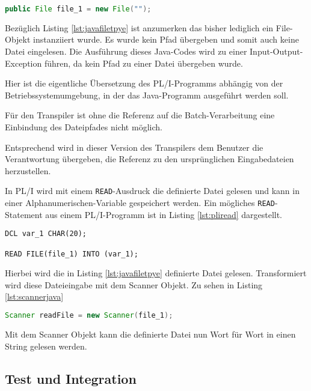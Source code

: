 \begin{lstlisting}[language=Java, caption=File Objekt in Java, label={lst:javafiletpye}]
public File file_1 = new File("");
\end{lstlisting} 

Bezüglich Listing \ref{lst:javafiletpye} ist anzumerken das bisher lediglich ein File-Objekt instanziiert wurde.
Es wurde kein Pfad übergeben und somit auch keine Datei eingelesen. 
Die Ausführung dieses Java-Codes wird zu einer Input-Output-Exception führen, da kein Pfad zu einer Datei übergeben wurde.

Hier ist die eigentliche Übersetzung des PL/I-Programms abhängig von der Betriebssystemumgebung, in der das Java-Programm ausgeführt werden soll.

Für den Transpiler ist ohne die Referenz auf die Batch-Verarbeitung eine Einbindung des Dateipfades nicht möglich.

Entsprechend wird in dieser Version des Transpilers dem Benutzer die Verantwortung übergeben, die Referenz zu den ursprünglichen Eingabedateien herzustellen.

In PL/I wird mit einem \verb+READ+-Ausdruck die definierte Datei gelesen und kann in einer Alphanumerischen-Variable gespeichert werden.
Ein mögliches \verb+READ+-Statement aus einem PL/I-Programm ist in Listing \ref{lst:pliread} dargestellt.

\begin{lstlisting}[language=PL/I, caption=READ Statement in PL/I, label={lst:pliread}]
DCL var_1 CHAR(20);

READ FILE(file_1) INTO (var_1); 
\end{lstlisting} 

Hierbei wird die in Listing \ref{lst:javafiletpye} definierte Datei gelesen.
Transformiert wird diese Dateieingabe mit dem Scanner Objekt. Zu sehen in Listing \ref{lst:scannerjava}

\begin{lstlisting}[language=Java, caption=Scanner Objekt in Java, label={lst:scannerjava}]
Scanner readFile = new Scanner(file_1);
\end{lstlisting} 

Mit dem Scanner Objekt kann die definierte Datei nun Wort für Wort in einen String gelesen werden.

\pagebreak
\subsection{Test und Integration}

